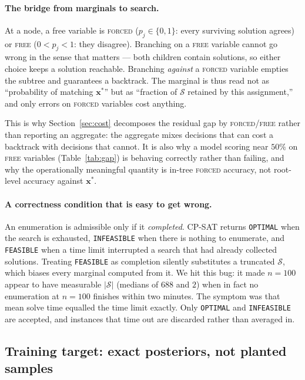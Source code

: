 \documentclass[12pt]{article}
\begin{document}
\paragraph{The bridge from marginals to search.} At a node, a free variable is \textsc{forced} ($p_j\in\{0,1\}$: every surviving solution agrees) or \textsc{free} ($0<p_j<1$: they disagree). Branching on a \textsc{free} variable cannot go wrong in the sense that matters --- both children contain solutions, so either choice keeps a solution reachable. Branching \emph{against} a \textsc{forced} variable empties the subtree and guarantees a backtrack. The marginal is thus read not as ``probability of matching $\mathbf{x}^\ast$'' but as ``fraction of $\mathcal{S}$ retained by this assignment,'' and only errors on \textsc{forced} variables cost anything.

This is why Section~\ref{sec:cost} decomposes the residual gap by \textsc{forced}/\textsc{free} rather than reporting an aggregate: the aggregate mixes decisions that can cost a backtrack with decisions that cannot. It is also why a model scoring near $50\%$ on \textsc{free} variables (Table~\ref{tab:gap}) is behaving correctly rather than failing, and why the operationally meaningful quantity is in-tree \textsc{forced} accuracy, not root-level accuracy against $\mathbf{x}^\ast$.

\paragraph{A correctness condition that is easy to get wrong.} An enumeration is admissible only if it \emph{completed}. CP-SAT returns \texttt{OPTIMAL} when the search is exhausted, \texttt{INFEASIBLE} when there is nothing to enumerate, and \texttt{FEASIBLE} when a time limit interrupted a search that had already collected solutions. Treating \texttt{FEASIBLE} as completion silently substitutes a truncated $\mathcal{S}$, which biases every marginal computed from it. We hit this bug: it made $n=100$ appear to have measurable $|\mathcal{S}|$ (medians of $688$ and $2$) when in fact no enumeration at $n=100$ finishes within two minutes. The symptom was that mean solve time equalled the time limit exactly. Only \texttt{OPTIMAL} and \texttt{INFEASIBLE} are accepted, and instances that time out are discarded rather than averaged in.

\subsection{Training target: exact posteriors, not planted samples}
\label{sec:m-target}
\end{document}
